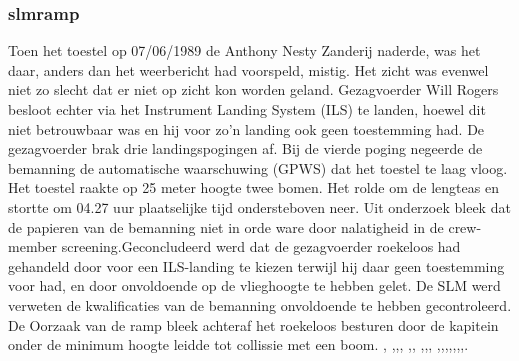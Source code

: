\documentclass{article}
\begin{document}
	\subsubsection{slmramp}
	\newline \indent
	Toen het toestel op 07/06/1989 de Anthony Nesty Zanderij naderde, was het daar, anders dan het weerbericht had voorspeld, mistig. Het zicht was evenwel niet zo slecht dat er niet op zicht kon worden geland. Gezagvoerder Will Rogers besloot echter via het Instrument Landing System (ILS) te landen, hoewel dit niet betrouwbaar was en hij voor zo'n landing ook geen toestemming had. De gezagvoerder brak drie landingspogingen af. Bij de vierde poging negeerde de bemanning de automatische waarschuwing (GPWS) dat het toestel te laag vloog. Het toestel raakte op 25 meter hoogte twee bomen. Het rolde om de lengteas en stortte om 04.27 uur plaatselijke tijd ondersteboven neer.
	Uit onderzoek bleek dat de papieren van de bemanning niet in orde ware door nalatigheid in de crew-member screening.Geconcludeerd werd dat de gezagvoerder roekeloos had gehandeld door voor een ILS-landing te kiezen terwijl hij daar geen toestemming voor had, en door onvoldoende op de vlieghoogte te hebben gelet. 
	De SLM werd verweten de kwalificaties van de bemanning onvoldoende te hebben gecontroleerd. De Oorzaak van de ramp bleek achteraf het roekeloos besturen door de kapitein onder de minimum hoogte leidde tot collissie met een boom.
	\cite{espnSLMterugblik},\cite{dennisRosier01052020}
	\cite{hassing07062020slmramp},\cite{amsterdamArchiefSLM},\cite{rtvOost06062019nabestaande},
	\cite{breda07062021AndroSnel},\cite{andereTijdenSLMCrash},
	\cite{aviationReport},\cite{aviationSLMCrashAccidentInvestigation},\cite{mcDonnelDouglasCommissionReportSLMCrash},
	\cite{wikiSRFlight764},\cite{nos07062019SLMTerugblik},\cite{dagvantoenSLMCrash},\cite{waterkantNesty07061989},\cite{eduNandlalSRCrash},\cite{oldjetsSRAirways},\cite{cloudberg02012021srflight764},\cite{apnews07061989srplanecrash}.
\end{document}
